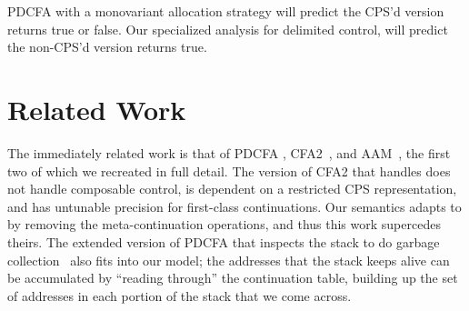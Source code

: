 {\begin{small}
\begin{SCodeFlow}
\begin{RktBlk}
\begin{SingleColumn}
\mbox{}\RktPn{[}\mbox{}\RktPn{(}\RktSym{$\lambda$}\mbox{}\RktPn{(}\mbox{}\RktPn{)}
\\\mbox{}\RktPn{(}\mbox{}\RktPn{(}\mbox{}\mbox{}\RktPn{(}\RktSym{$\lambda$}\mbox{}\RktPn{(}\RktPn{)}
\\\mbox{}\RktPn{(}\mbox{}\mbox{}\RktPn{(}\RktSym{$\lambda$}\mbox{}\RktPn{(}\RktPn{)}\mbox{}\RktPn{)}\RktPn{)}\RktPn{)}\RktPn{)}\RktPn{)}\RktPn{)}\RktPn{]}\RktPn{)}

\mbox{}\RktPn{(}\mbox{}\mbox{}\RktPn{(}\RktSym{$\lambda$}\mbox{}\RktPn{(}\RktPn{)}\mbox{}\RktPn{(}\mbox{}\mbox{}\RktPn{(}\RktSym{$\lambda$}\mbox{}\RktPn{(}\RktPn{)}\mbox{}\RktPn{(}\RktSym{$\le$}\mbox{}\mbox{}\RktPn{)}\RktPn{)}\RktPn{)}\RktPn{)}\RktPn{)}\RktPn{)}\end{SingleColumn}\end{RktBlk}\end{SCodeFlow}
\end{small}
PDCFA with a monovariant allocation strategy will predict the CPS'd version returns true or false.
%
Our specialized analysis for delimited control, will predict the non-CPS'd version returns true.}

\section{Related Work}

The immediately related work is that of PDCFA \citep{dvanhorn:Earl2010Pushdown, dvanhorn:Earl2012Introspective}, CFA2~\citep{ianjohnson:vardoulakis-lmcs11, ianjohnson:Vardoulakis2011Pushdown}, and AAM~\citep{dvanhorn:VanHorn2010Abstracting}, the first two of which we recreated in full detail.
%
The version of CFA2 that handles  does not handle composable control, is dependent on a restricted CPS representation, and has untunable precision for first-class continuations.
%
Our semantics adapts to  by removing the meta-continuation operations, and thus this work supercedes theirs.
%
The extended version of PDCFA that inspects the stack to do garbage collection~\citep{dvanhorn:Earl2012Introspective} also fits into our model;
the addresses that the stack keeps alive can be accumulated by ``reading through'' the continuation table, building up the set of addresses in each portion of the stack that we come across.

